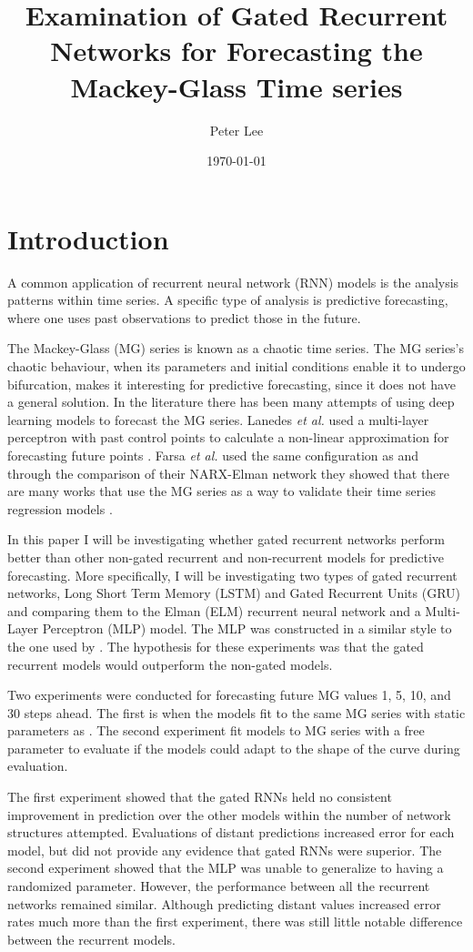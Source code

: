 \documentclass[11pt]{article}
\author{Peter Lee}
\date{\today}
\title{Examination of Gated Recurrent Networks for Forecasting the Mackey-Glass Time series}
\begin{document}
\maketitle

\section{Introduction}
A common application of recurrent neural network (RNN) models is the
analysis patterns within time series. A specific
type of analysis is predictive forecasting, where one uses past
observations to predict those in the future. 

The Mackey-Glass (MG) series \cite{MG} is known as a chaotic time series.
The MG series's chaotic behaviour, when its parameters and initial
conditions enable it to undergo bifurcation, makes it interesting
for predictive forecasting, since it does not have a general
solution. In the literature there has been many attempts of using deep
learning models to forecast the MG
series. Lanedes \textit{et al.} used a multi-layer perceptron with past control
points to calculate a non-linear approximation for forecasting future
points \cite{tr}. Farsa \textit{et al.} used the same configuration as
\cite{tr} and through the comparison of their NARX-Elman network they showed
that there are many works that use the MG series as a way to validate
their time series regression models \cite{Farsa}.

In this paper I will be investigating whether gated recurrent networks
perform better than other non-gated recurrent and non-recurrent models for predictive
forecasting. More specifically, I will be investigating two types of
gated recurrent networks, Long Short Term Memory (LSTM) \cite{LSTM}
and Gated Recurrent Units (GRU) \cite{GRU} and comparing them to the Elman (ELM) recurrent neural network and a Multi-Layer Perceptron (MLP) model. The MLP was constructed in a similar style to the one used by \cite{tr}. The hypothesis for these experiments was that the gated recurrent models would outperform the non-gated models.

Two experiments were conducted for forecasting future MG values 1, 5,
10, and 30 steps ahead. The first is when the models fit to the same MG series with static parameters as \cite{tr,Farsa}. The second experiment fit models to MG series with
a free parameter to evaluate if the models could adapt to the shape of
the curve during evaluation. 

The first experiment showed that the gated RNNs held no consistent improvement in prediction over
the other models within the number of network structures attempted. Evaluations of distant predictions increased
error for each model, but did not provide any evidence that gated RNNs were superior. The second experiment showed that the MLP was unable to generalize to
having a randomized parameter. However, the performance between all the
recurrent networks remained similar. Although predicting distant
values increased error rates much more than the first experiment,
there was still little notable difference between the recurrent
models.
\end{document}
